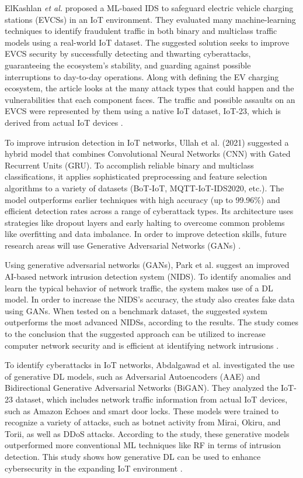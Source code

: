 ElKashlan \textit{et al.} proposed a ML-based IDS to safeguard electric vehicle charging stations (EVCSs) in an IoT environment. They evaluated many machine-learning techniques to identify fraudulent traffic in both binary and multiclass traffic models using a real-world IoT dataset.  The suggested solution seeks to improve EVCS security by successfully detecting and thwarting cyberattacks, guaranteeing the ecosystem's stability, and guarding against possible interruptions to day-to-day operations.  Along with defining the EV charging ecosystem, the article looks at the many attack types that could happen and the vulnerabilities that each component faces. The traffic and possible assaults on an EVCS were represented by them using a native IoT dataset, IoT-23, which is derived from actual IoT devices \cite{elkashlan_machine_2023}.

To improve intrusion detection in IoT networks, Ullah et al. (2021) suggested a hybrid model that combines Convolutional Neural Networks (CNN) with Gated Recurrent Units (GRU). To accomplish reliable binary and multiclass classifications, it applies sophisticated preprocessing and feature selection algorithms to a variety of datasets (BoT-IoT, MQTT-IoT-IDS2020, etc.). The model outperforms earlier techniques with high accuracy (up to 99.96\%) and efficient detection rates across a range of cyberattack types. Its architecture uses strategies like dropout layers and early halting to overcome common problems like overfitting and data imbalance. In order to improve detection skills, future research areas will use Generative Adversarial Networks (GANs) \cite{ullah_towards_2021}. 

Using generative adversarial networks (GANs), Park et al. suggest an improved AI-based network intrusion detection system (NIDS). To identify anomalies and learn the typical behavior of network traffic, the system makes use of a DL model.  In order to increase the NIDS's accuracy, the study also creates fake data using GANs.  When tested on a benchmark dataset, the suggested system outperforms the most advanced NIDSs, according to the results.  The study comes to the conclusion that the suggested approach can be utilized to increase computer network security and is efficient at identifying network intrusions \cite{park_enhanced_2023}.

To identify cyberattacks in IoT networks, Abdalgawad et al. investigated the use of generative DL models, such as Adversarial Autoencoders (AAE) and Bidirectional Generative Adversarial Networks (BiGAN). They analyzed the IoT-23 dataset, which includes network traffic information from actual IoT devices, such as Amazon Echoes and smart door locks. These models were trained to recognize a variety of attacks, such as botnet activity from Mirai, Okiru, and Torii, as well as DDoS attacks. According to the study, these generative models outperformed more conventional ML techniques like RF in terms of intrusion detection. This study shows how generative DL can be used to enhance cybersecurity in the expanding IoT environment \cite{abdalgawad_generative_2022}.


%